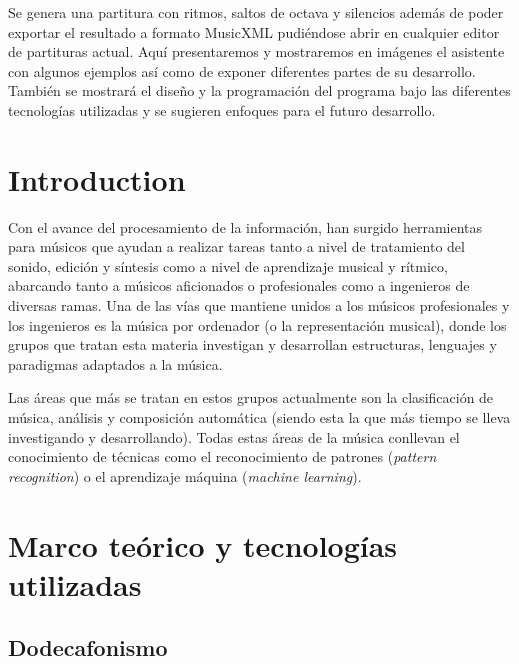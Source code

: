 \documentclass[a4paper,openany,12pt]{memoir}
\begin{document}
Se genera una partitura con ritmos, saltos de octava y silencios además de poder exportar el resultado a formato MusicXML pudiéndose abrir en cualquier editor de partituras actual. Aquí presentaremos y mostraremos en imágenes el asistente con algunos ejemplos así como de exponer diferentes partes de su desarrollo. También se mostrará el diseño y la programación del programa bajo las diferentes tecnologías utilizadas y se sugieren enfoques para el futuro desarrollo.



\newpage


\tableofcontents %

\cleardoublepage
{} %
\listoffigures %





\chapter{Introduction}
Con el avance del procesamiento de la información, han surgido herramientas para músicos que ayudan a realizar tareas tanto a nivel de tratamiento del sonido, edición y síntesis como a nivel de aprendizaje musical y rítmico, abarcando tanto a músicos aficionados o profesionales como a ingenieros de diversas ramas. Una de las vías que mantiene unidos a los músicos profesionales y los ingenieros es la música por ordenador (o la representación musical), donde los grupos que tratan esta materia investigan y desarrollan estructuras, lenguajes y paradigmas adaptados a la música.

Las áreas que más se tratan en estos grupos actualmente son la clasificación de música, análisis y composición automática (siendo esta la que más tiempo se lleva investigando y desarrollando). Todas estas áreas de la música conllevan el conocimiento de técnicas como el reconocimiento de patrones (\emph{pattern recognition}) o el aprendizaje máquina (\emph{machine learning}).

\chapter{Marco teórico y tecnologías utilizadas}\label{marcoteorico}
\section{Dodecafonismo}
\end{document}
